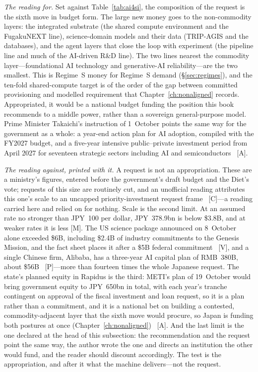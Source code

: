 \emph{The reading for.} Set against Table~\ref{tab:ai4si}, the composition of the request is the sixth move in budget form. The large new money goes to the non-commodity layers: the integrated substrate (the shared compute environment and the FugakuNEXT line), science-domain models and their data (TRIP-AGIS and the databases), and the agent layers that close the loop with experiment (the pipeline line and much of the AI-driven R\&D line). The two lines nearest the commodity layer---foundational AI technology and generative-AI reliability---are the two smallest. This is Regime~S money for Regime~S demand (\S\ref{sec:regimes}), and the ten-fold shared-compute target is of the order of the gap between committed provisioning and modelled requirement that Chapter~\ref{ch:nonaligned} records. Appropriated, it would be a national budget funding the position this book recommends to a middle power, rather than a sovereign general-purpose model. Prime Minister Takaichi's instruction of 1~October points the same way for the government as a whole: a year-end action plan for AI adoption, compiled with the FY2027 budget, and a five-year intensive public--private investment period from April 2027 for seventeen strategic sectors including AI and semiconductors~\cite{gov-takaichi} [A].

\emph{The reading against, printed with it.} A request is not an appropriation. These are a ministry's figures, entered before the government's draft budget and the Diet's vote; requests of this size are routinely cut, and an unofficial reading attributes this one's scale to an uncapped priority-investment request frame~\cite{gov-mext-fy2027} [C]---a reading carried here and relied on for nothing. Scale is the second limit. At an assumed rate no stronger than JPY~100 per dollar, JPY~378.9bn is below \$3.8B, and at weaker rates it is less [M]. The US science package announced on 8~October alone exceeded \$6B, including \$2.4B of industry commitments to the Genesis Mission, and the fact sheet places it after a \$5B federal commitment~\cite{sci-wh-summit} [V], and a single Chinese firm, Alibaba, has a three-year AI capital plan of RMB~380B, about \$56B~\cite{alibaba-capex} [P]---more than fourteen times the whole Japanese request. The state's planned equity in Rapidus is the third: METI's plan of 19~October would bring government equity to JPY~650bn in total, with each year's tranche contingent on approval of the fiscal investment and loan request, so it is a plan rather than a commitment, and it is a national bet on building a contested, commodity-adjacent layer that the sixth move would procure, so Japan is funding both postures at once (Chapter~\ref{ch:nonaligned})~\cite{gov-rapidus} [A]. And the last limit is the one declared at the head of this subsection: the recommendation and the request point the same way, the author wrote the one and directs an institution the other would fund, and the reader should discount accordingly. The test is the appropriation, and after it what the machine delivers---not the request.


